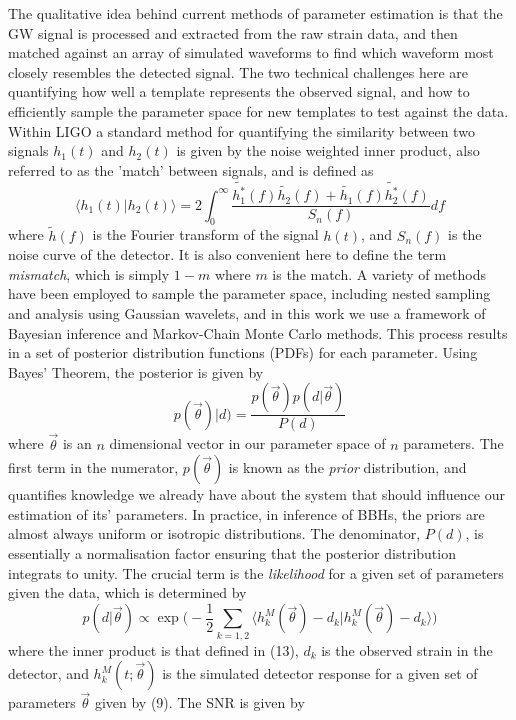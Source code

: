 \documentclass[11pt]{article}
\begin{document}
The qualitative idea behind current methods of parameter estimation is that the GW signal is processed and extracted from the raw strain data, and then matched against an array of simulated waveforms to find which waveform most closely resembles the detected signal. The two technical challenges here are quantifying how well a template represents the observed signal, and how to efficiently sample the parameter space for new templates to test against the data. Within LIGO a standard method for quantifying the similarity between two signals $h_1(t)$ and $h_2(t)$ is given by the noise weighted inner product, also referred to as the 'match' between signals, and is defined as
\begin{equation}
\langle h_1(t) \vert h_2(t) \rangle=2\int_{0}^{\infty}\frac{\tilde{h_1^*}(f)\tilde{h_2}(f)+\tilde{h_1}(f)\tilde{h_2^*}(f)}{S_n(f)}df 
\end{equation}
where $\tilde{h}(f)$ is the Fourier transform of the signal $h(t)$, and $S_n(f)$ is the noise curve of the detector\cite{oldest_pe}. It is also convenient here to define the term \textit{mismatch}, which is simply $1-m$ where $m$ is the match. A variety of methods have been employed to sample the parameter space, including nested sampling\cite{pe2} and analysis using Gaussian wavelets\cite{props}, and in this work we use a framework of Bayesian inference and Markov-Chain Monte Carlo methods\cite{inj}\cite{pe}\cite{pe4}. This process results in a set of posterior distribution functions (PDFs) for each parameter. Using Bayes' Theorem, the posterior is given by
\begin{equation}
p(\vec{\theta})|d)=\frac{p(\vec{\theta})p(d|\vec{\theta})}{P(d)}
\end{equation}
where $\vec{\theta}$ is an $n$ dimensional vector in our parameter space of $n$ parameters\cite{pe2}. The first term in the numerator, $p(\vec{\theta})$ is known as the \textit{prior} distribution, and quantifies knowledge we already have about the system that should influence our estimation of its' parameters. In practice, in inference of BBHs, the priors are almost always uniform or isotropic distributions. The denominator, $P(d)$, is essentially a normalisation factor ensuring that the posterior distribution integrats to unity. The crucial term is the \textit{likelihood} for a given set of parameters given the data, which is determined by
\begin{equation}
p(d|\vec{\theta})\propto \exp\bigg(-\frac{1}{2}\sum_{k=1,2}\Big \langle h^M_k(\vec{\theta})-d_k \big\vert h^M_k(\vec{\theta})-d_k \Big \rangle\bigg)
\end{equation}
where the inner product is that defined in (13), $d_k$ is the observed strain in the detector, and $h_k^M(t;\vec{\theta})$ is the simulated detector response for a given set of parameters $\vec{\theta}$ given by (9). The SNR is given by
\end{document}
